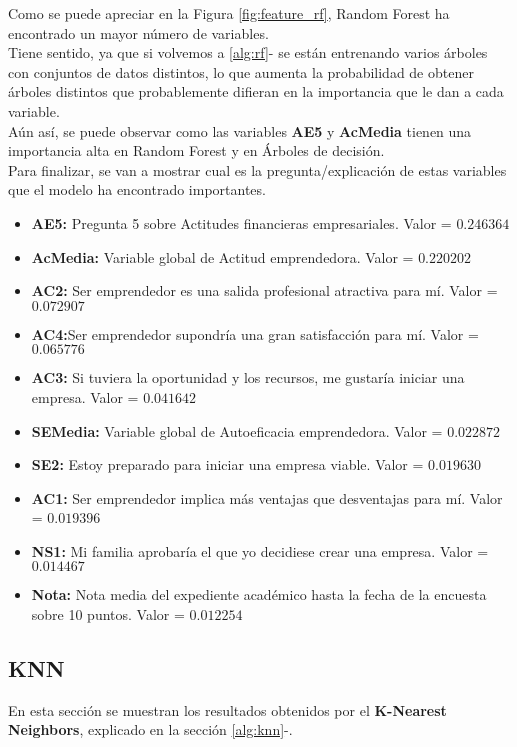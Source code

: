 Como se puede apreciar en la Figura \ref{fig:feature_rf}, Random Forest ha encontrado un mayor número de variables. \\
Tiene sentido, ya que si volvemos a \ref{alg:rf}- se están entrenando varios árboles con conjuntos de datos distintos, lo que aumenta la probabilidad de obtener árboles distintos que probablemente difieran en la importancia que le dan a cada variable.\\
Aún así, se puede observar como las variables \textbf{AE5} y \textbf{AcMedia} tienen una importancia alta en Random Forest y en Árboles de decisión.\\
\linebreak
Para finalizar, se van a mostrar cual es la pregunta/explicación de estas variables que el modelo ha encontrado importantes.
\begin{itemize}
	\item\textbf{AE5:} Pregunta 5 sobre Actitudes financieras empresariales. Valor = $0.246364$
	\item\textbf{AcMedia:} Variable global de Actitud emprendedora. Valor = $0.220202$
	\item\textbf{AC2:} Ser emprendedor es una salida profesional atractiva para mí. Valor = $0.072907$
	\item\textbf{AC4:}Ser emprendedor supondría una gran satisfacción para mí. Valor = $0.065776$
	\item\textbf{AC3:} Si tuviera la oportunidad y los recursos, me gustaría iniciar una empresa. Valor = $0.041642$
	\item\textbf{SEMedia:} Variable global de Autoeficacia emprendedora. Valor = $0.022872$
	\item\textbf{SE2:} Estoy preparado para iniciar una empresa viable. Valor = $0.019630$
	\item\textbf{AC1:} Ser emprendedor implica más ventajas que desventajas para mí. Valor = $0.019396$
	\item\textbf{NS1:} Mi familia aprobaría el que yo decidiese crear una empresa. Valor = $0.014467$
	\item\textbf{Nota:} Nota media del expediente académico hasta la fecha de la encuesta sobre 10 puntos. Valor = $0.012254$
\end{itemize}

\pagebreak
\subsection{KNN}
En esta sección se muestran los resultados obtenidos por el \textbf{K-Nearest Neighbors}, explicado en la sección \ref{alg:knn}-.
